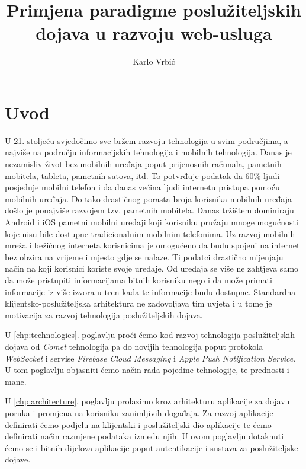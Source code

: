 \documentclass[times, utf8, zavrsni]{fer}
\begin{document}
\title{Primjena paradigme poslužiteljskih dojava u razvoju web-usluga}
\author{Karlo Vrbić}

\maketitle

\zahvala{}

\tableofcontents
\listoffigures

\chapter{Uvod}

U 21. stoljeću svjedočimo sve bržem razvoju tehnologija u svim područjima, a najviše na području informacijskih tehnologija i mobilnih tehnologija. Danas je nezamisliv život bez mobilnih uređaja poput prijenosnih računala, pametnih mobitela, tableta, pametnih satova, itd. To potvrđuje podatak da 60\% ljudi posjeduje mobilni telefon i da danas većina ljudi internetu pristupa pomoću mobilnih uređaja. Do tako drastičnog porasta broja korisnika mobilnih uređaja došlo je ponajviše razvojem tzv. pametnih mobitela. Danas tržištem dominiraju Android i iOS pametni mobilni uređaji koji korisniku pružaju mnoge mogućnosti koje nisu bile dostupne tradicionalnim mobilnim telefonima. Uz razvoj mobilnih mreža i bežičnog interneta korisnicima je omogućeno da budu spojeni na internet bez obzira na vrijeme i mjesto gdje se nalaze. Ti podatci drastično mijenjaju način na koji korisnici koriste svoje uređaje. Od uređaja se više ne zahtjeva samo da može pristupiti informacijama bitnih korisniku nego i da može primati informacije iz više izvora u tren kada te informacije budu dostupne. Standardna klijentsko-poslužiteljska arhitektura ne zadovoljava tim uvjeta i u tome je motivacija za razvoj tehnologija poslužiteljskih dojava.

U \ref{chp:technologies}. poglavlju proći ćemo kod razvoj tehnologija poslužiteljskih dojava od {\em Comet} tehnologija pa do novijih tehnologija poput protokola {\em WebSocket} i servise {\em Firebase Cloud Messaging} i {\em Apple Push Notification Service}. U tom poglavlju objasniti ćemo način rada pojedine tehnologije, te prednosti i mane.

U \ref{chp:architecture}. poglavlju prolazimo kroz arhitekturu aplikacije za dojavu poruka i promjena na korisniku zanimljivih događaja. Za razvoj aplikacije definirati ćemo podjelu na klijentski i poslužiteljski dio aplikacije te ćemo definirati način razmjene podataka između njih. U ovom poglavlju dotaknuti ćemo se i bitnih dijelova aplikacije poput autentikacije i sustava za poslužiteljske dojave.
\end{document}
